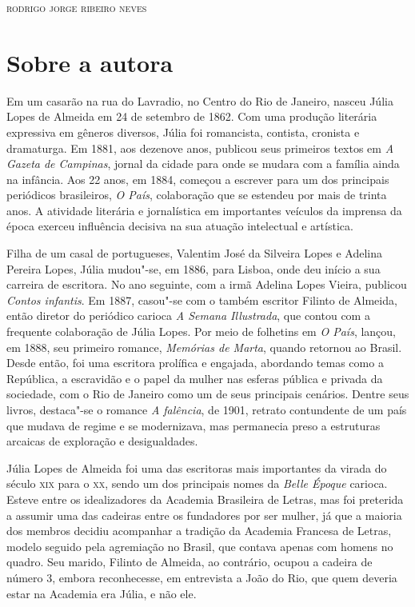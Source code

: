 
\begin{flushright}
\textsc{rodrigo jorge ribeiro neves}
\end{flushright}\medskip

\section{Sobre a autora}

\noindent{}Em um casarão na rua do Lavradio, no Centro do Rio de Janeiro, nasceu
Júlia Lopes de Almeida em 24 de setembro de 1862. Com uma produção
literária expressiva em gêneros diversos, Júlia foi romancista,
contista, cronista e dramaturga. Em 1881, aos dezenove anos, publicou
seus primeiros textos em \emph{A Gazeta de Campinas}, jornal da cidade
para onde se mudara com a família ainda na infância. Aos 22 anos, em
1884, começou a escrever para um dos principais periódicos brasileiros,
\emph{O País}, colaboração que se estendeu por mais de trinta anos. A
atividade literária e jornalística em importantes veículos da imprensa
da época exerceu influência decisiva na sua atuação intelectual e
artística.

Filha de um casal de portugueses, Valentim José da Silveira Lopes e
Adelina Pereira Lopes, Júlia mudou"-se, em 1886, para Lisboa, onde deu
início a sua carreira de escritora. No ano seguinte, com a irmã Adelina
Lopes Vieira, publicou \emph{Contos infantis}. Em 1887, casou"-se com o
também escritor Filinto de Almeida, então diretor do periódico carioca
\emph{A Semana Illustrada}, que contou com a frequente colaboração de
Júlia Lopes. Por meio de folhetins em \emph{O País}, lançou, em 1888,
seu primeiro romance, \emph{Memórias de Marta}, quando retornou ao
Brasil. Desde então, foi uma escritora prolífica e engajada, abordando
temas como a República, a escravidão e o papel da mulher nas esferas
pública e privada da sociedade, com o Rio de Janeiro como um de seus
principais cenários. Dentre seus livros, destaca"-se o romance \emph{A
falência}, de 1901, retrato contundente de um país que mudava de regime
e se modernizava, mas permanecia preso a estruturas arcaicas de
exploração e desigualdades.

Júlia Lopes de Almeida foi uma das escritoras mais importantes da virada
do século \textsc{xix} para o \textsc{xx}, sendo um dos principais nomes da \emph{Belle Époque} carioca. Esteve entre os idealizadores da Academia Brasileira de
Letras, mas foi preterida a assumir uma das cadeiras entre os fundadores
por ser mulher, já que a maioria dos membros decidiu acompanhar a
tradição da Academia Francesa de Letras, modelo seguido pela agremiação
no Brasil, que contava apenas com homens no quadro. Seu marido, Filinto
de Almeida, ao contrário, ocupou a cadeira de número 3, embora
reconhecesse, em entrevista a João do Rio, que quem deveria estar na
Academia era Júlia, e não ele.


